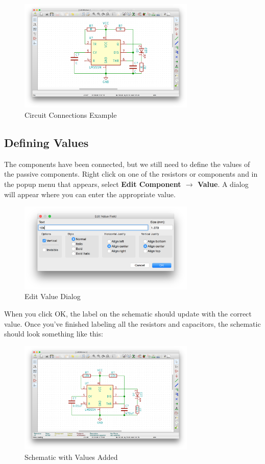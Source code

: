 \documentclass[12pt, oneside]{article}
\begin{document}
\begin{figure}[H]
\includegraphics[width=0.75\textwidth]{SchematicConnections}
\centering
\caption{Circuit Connections Example}
\end{figure}

\subsection{Defining Values}
The components have been connected, but we still need to define the values of the passive components. Right click on one of the resistors or components and in the popup menu that appears, select \textbf{Edit Component $\rightarrow$ Value}. A dialog will appear where you can enter the appropriate value. 

\begin{figure}[H]
\includegraphics[width=0.75\textwidth]{EditValue}
\centering
\caption{Edit Value Dialog}
\end{figure}

When you click OK, the label on the schematic should update with the correct value. Once you've finished labeling all the resistors and capacitors, the schematic should look something like this:

\begin{figure}[H]
\includegraphics[width=0.75\textwidth]{AddedValues}
\centering
\caption{Schematic with Values Added}
\end{figure}
\end{document}
